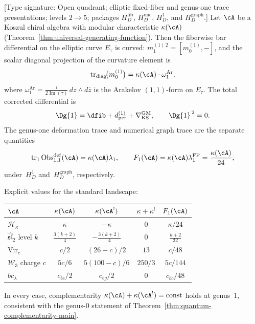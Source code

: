 \begin{theorem}
\label{thm:genus1-universal-curvature}
\textup{[Type signature: Open quadrant; elliptic fixed-fiber and
genus-one trace presentations; levels $2\to5$; packages
$H_D^{\mathrm{fib}}$, $H_D^{\mathrm{unc}}$, $H_D^1$, and
$H_D^{\mathrm{graph}}$.]}
Let $\cA$ be a Koszul chiral algebra with modular characteristic $\kappa(\cA)$
\textup{(Theorem~\ref{thm:universal-generating-function})}. Then the fiberwise
bar differential on the elliptic curve $E_\tau$ is curved:
$m_1^{(1)\,2}=[m_0^{(1)},-]$, and the scalar diagonal projection of
the curvature element is
\begin{equation}
\label{eq:genus1-curved-bar-universal}
\operatorname{tr}_{\mathrm{diag}}\!\bigl(m_0^{(1)}\bigr)
= \kappa(\cA) \cdot \omega_1^{\mathrm{Ar}},
\end{equation}
where $\omega_1^{\mathrm{Ar}}
= \frac{i}{2\operatorname{Im}(\tau)}\,dz\wedge d\bar{z}$ is the
Arakelov $(1,1)$-form on $E_\tau$.
The total corrected differential is
\[
 \Dg{1}=\dfib+d_{\mathrm{per}}^{(1)}
 +\nabla_{\mathrm{KS}}^{\mathrm{GM}},
 \qquad \Dg{1}^{\,2}=0.
\]
The genus-one deformation trace and numerical graph trace are the
separate quantities
\[
 \operatorname{tr}_1\operatorname{Obs}^{\mathrm{def}}_{1,1}(\cA)
 =\kappa(\cA)\lambda_1,
 \qquad
 F_1(\cA)=\kappa(\cA)\lambda_1^{\mathrm{FP}}
 =\frac{\kappa(\cA)}{24},
\]
under~$H_D^1$ and~$H_D^{\mathrm{graph}}$, respectively.

Explicit values for the standard landscape:
\begin{center}
\begin{tabular}{lcccc}
\toprule
$\cA$ & $\kappa(\cA)$ & $\kappa(\cA^!)$ & $\kappa + \kappa^!$ & $F_1(\cA)$ \\
\midrule
$\mathcal{H}_\kappa$ & $\kappa$ & $-\kappa$ & $0$ & $\kappa/24$ \\
$\widehat{\mathfrak{sl}}_2$ level $k$ & $\tfrac{3(k+2)}{4}$ & $-\tfrac{3(k+2)}{4}$ & $0$ & $\tfrac{k+2}{32}$ \\
$\mathrm{Vir}_c$ & $c/2$ & $(26-c)/2$ & $13$ & $c/48$ \\
$\mathcal{W}_3$ charge $c$ & $5c/6$ & $5(100-c)/6$ & $250/3$ & $5c/144$ \\
$bc_\lambda$ & $c_{bc}/2$ & $c_{bg}/2$ & $0$ & $c_{bc}/48$ \\
\bottomrule
\end{tabular}
\end{center}
In every case, complementarity $\kappa(\cA) + \kappa(\cA^!) = \mathrm{const}$
holds at genus~$1$, consistent with the genus-$0$ statement of
Theorem~\textup{\ref{thm:quantum-complementarity-main}}.
\end{theorem}

